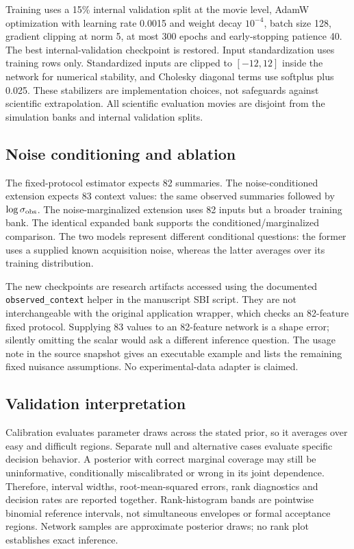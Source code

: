 \documentclass[11pt]{article}
\begin{document}
Training uses a 15\% internal validation split at the movie level, AdamW optimization with learning rate 0.0015 and weight decay $10^{-4}$, batch size 128, gradient clipping at norm 5, at most 300 epochs and early-stopping patience 40. The best internal-validation checkpoint is restored. Input standardization uses training rows only. Standardized inputs are clipped to $[-12,12]$ inside the network for numerical stability, and Cholesky diagonal terms use softplus plus 0.025. These stabilizers are implementation choices, not safeguards against scientific extrapolation. All scientific evaluation movies are disjoint from the simulation banks and internal validation splits.

\subsection{Noise conditioning and ablation}
The fixed-protocol estimator expects 82 summaries. The noise-conditioned extension expects 83 context values: the same observed summaries followed by $\log\sigma_{\rm obs}$. The noise-marginalized extension uses 82 inputs but a broader training bank. The identical expanded bank supports the conditioned/marginalized comparison. The two models represent different conditional questions: the former uses a supplied known acquisition noise, whereas the latter averages over its training distribution.

The new checkpoints are research artifacts accessed using the documented \texttt{observed\_context} helper in the manuscript SBI script. They are not interchangeable with the original application wrapper, which checks an 82-feature fixed protocol. Supplying 83 values to an 82-feature network is a shape error; silently omitting the scalar would ask a different inference question. The usage note in the source snapshot gives an executable example and lists the remaining fixed nuisance assumptions. No experimental-data adapter is claimed.

\subsection{Validation interpretation}
Calibration evaluates parameter draws across the stated prior, so it averages over easy and difficult regions. Separate null and alternative cases evaluate specific decision behavior. A posterior with correct marginal coverage may still be uninformative, conditionally miscalibrated or wrong in its joint dependence. Therefore, interval widths, root-mean-squared errors, rank diagnostics and decision rates are reported together. Rank-histogram bands are pointwise binomial reference intervals, not simultaneous envelopes or formal acceptance regions. Network samples are approximate posterior draws; no rank plot establishes exact inference.
\end{document}
